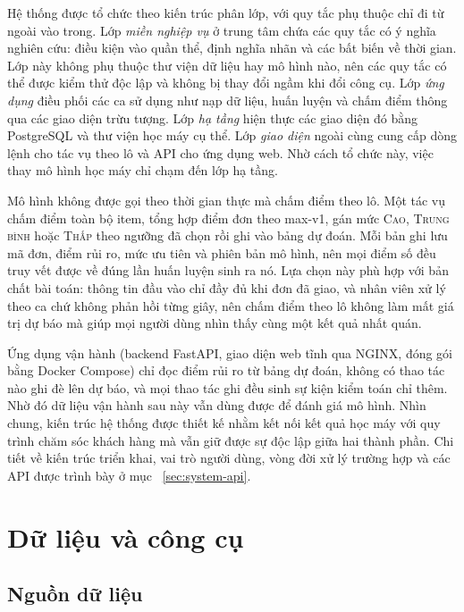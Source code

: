 \documentclass[12pt,a4paper]{report}
\begin{document}
Hệ thống được tổ chức theo kiến trúc phân lớp, với quy tắc phụ thuộc chỉ đi từ ngoài vào trong. Lớp \emph{miền nghiệp vụ} ở trung tâm chứa các quy tắc có ý nghĩa nghiên cứu: điều kiện vào quần thể, định nghĩa nhãn và các bất biến về thời gian. Lớp này không phụ thuộc thư viện dữ liệu hay mô hình nào, nên các quy tắc có thể được kiểm thử độc lập và không bị thay đổi ngầm khi đổi công cụ. Lớp \emph{ứng dụng} điều phối các ca sử dụng như nạp dữ liệu, huấn luyện và chấm điểm thông qua các giao diện trừu tượng. Lớp \emph{hạ tầng} hiện thực các giao diện đó bằng PostgreSQL và thư viện học máy cụ thể. Lớp \emph{giao diện} ngoài cùng cung cấp dòng lệnh cho tác vụ theo lô và API cho ứng dụng web. Nhờ cách tổ chức này, việc thay mô hình học máy chỉ chạm đến lớp hạ tầng.

Mô hình không được gọi theo thời gian thực mà chấm điểm theo lô. Một tác vụ chấm điểm toàn bộ item, tổng hợp điểm đơn theo max-v1, gán mức \textsc{Cao}, \textsc{Trung bình} hoặc \textsc{Thấp} theo ngưỡng đã chọn rồi ghi vào bảng dự đoán. Mỗi bản ghi lưu mã đơn, điểm rủi ro, mức ưu tiên và phiên bản mô hình, nên mọi điểm số đều truy vết được về đúng lần huấn luyện sinh ra nó. Lựa chọn này phù hợp với bản chất bài toán: thông tin đầu vào chỉ đầy đủ khi đơn đã giao, và nhân viên xử lý theo ca chứ không phản hồi từng giây, nên chấm điểm theo lô không làm mất giá trị dự báo mà giúp mọi người dùng nhìn thấy cùng một kết quả nhất quán.

Ứng dụng vận hành (backend FastAPI, giao diện web tĩnh qua NGINX, đóng gói bằng Docker Compose) chỉ đọc điểm rủi ro từ bảng dự đoán, không có thao tác nào ghi đè lên dự báo, và mọi thao tác ghi đều sinh sự kiện kiểm toán chỉ thêm. Nhờ đó dữ liệu vận hành sau này vẫn dùng được để đánh giá mô hình. Nhìn chung, kiến trúc hệ thống được thiết kế nhằm kết nối kết quả học máy với quy trình chăm sóc khách hàng mà vẫn giữ được sự độc lập giữa hai thành phần. Chi tiết về kiến trúc triển khai, vai trò người dùng, vòng đời xử lý trường hợp và các API được trình bày ở mục ~\ref{sec:system-api}.

\section{Dữ liệu và công cụ}\label{sec:data}

\subsection{Nguồn dữ liệu}
\end{document}
